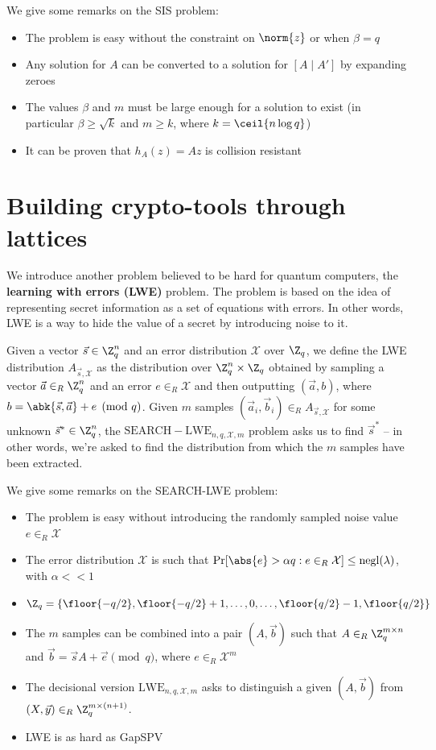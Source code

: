 \documentclass[a4paper, 12pt]{report}
\begin{document}
    We give some remarks on the SIS problem:
    \begin{itemize}
        \item The problem is easy without the constraint on $\norm{z}$ or when $\beta = q$
        \item Any solution for $A$ can be converted to a solution for $[A \mid A']$ by expanding zeroes
        \item The values $\beta$ and $m$ must be large enough for a solution to exist (in particular $\beta \geq \sqrt{k}$ and $m \geq k$, where $k = \ceil{n \log q}$)
        \item It can be proven that $h_A(z) = Az$ is collision resistant
    \end{itemize}

    \section{Building crypto-tools through lattices}

    We introduce another problem believed to be hard for quantum computers, the \textbf{learning with errors (LWE)} problem. The problem is based on the idea of representing secret information as a set of equations with errors. In other words, LWE is a way to hide the value of a secret by introducing noise to it.
    
    Given a vector $\vec s \in \Z_q^n$ and an error distribution $\mathcal{X}$ over $\Z_q$, we define the LWE distribution $A_{\vec s,\mathcal{X}}$ as the distribution over $\Z_q^n \times \Z_q$ obtained by sampling a vector $\vec a \in_R \Z_q^n$ and an error $e \in_R \mathcal{X}$ and then outputting $(\vec a, b)$, where $b = \abk{\vec s,\vec a} +e \pmod q$. Given $m$ samples $(\vec a_i, \vec b_i) \in_R A_{\vec s,\mathcal{X}}$ for some unknown $\vec s^* \in \Z_q^{n}$, the $\mathrm{SEARCH-LWE}_{n,q,\mathcal{X},m}$ problem asks us to find $\vec s^*$ -- in other words, we're asked to find the distribution from which the $m$ samples have been extracted.

    We give some remarks on the SEARCH-LWE problem:
    \begin{itemize}
        \item The problem is easy without introducing the randomly sampled noise value $e \in_R \mathcal{X}$
        \item The error distribution $\mathcal{X}$ is such that $\Pr[\abs{e} > \alpha q : e \in_R \mathcal{X}] \leq \mathrm{negl}(\lambda)$, with $\alpha << 1$
        \item $\Z_q = \{\floor{-q/2}, \floor{-q/2} + 1, \ldots, 0, \ldots, \floor{q/2}-1, \floor{q/2}\}$
        \item The $m$ samples can be combined into a pair $(A,\vec b)$ such that $A \in_R \Z_q^{m \times n}$ and $\vec b = \vec s A + \vec e \pmod q$, where $e \in_R \mathcal{X}^m$
        \item The decisional version $\mathrm{LWE}_{n,q,\mathcal{X},m}$ asks to distinguish a given $(A, \vec b)$ from $(X, \vec y) \in_R \Z_q^{m \times (n+1)}$.
        \item LWE is as hard as GapSPV
    \end{itemize}
\end{document}
